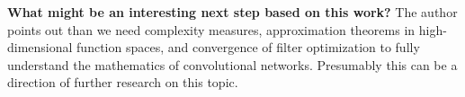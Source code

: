 
\noindent\textbf{What might be an interesting next step based on this work?} The
author points out than we need complexity measures, approximation theorems in
high-dimensional function spaces, and convergence of filter optimization to
fully understand the mathematics of convolutional networks. Presumably this can
be a direction of further research on this topic. 




